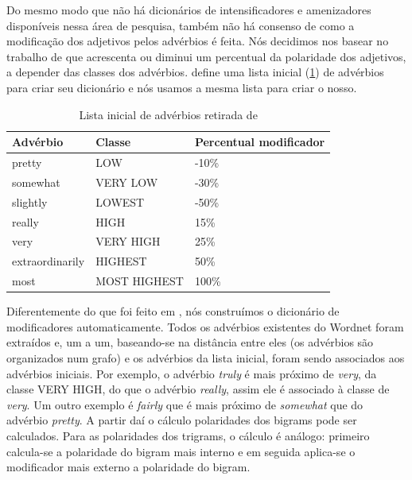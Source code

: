 Do mesmo modo que não há dicionários de intensificadores e amenizadores disponíveis nessa área de pesquisa, também não há consenso de como a modificação dos adjetivos pelos advérbios é feita. Nós decidimos nos basear no trabalho de \cite{taboada2011lexicon} que acrescenta ou diminui um percentual da polaridade dos adjetivos, a depender das classes dos advérbios.  define uma lista inicial (\ref{table:adv_seed}) de advérbios para criar seu dicionário e nós usamos a mesma lista para criar o nosso.

\begin{table}[!h]
	\centering
    \begin{tabular}{lll}
    Advérbio         				& Classe          & Percentual modificador \\ \hline
    pretty                   			& LOW 			   & -10\% \\
    somewhat                   	& VERY LOW  & -30\% \\
    slightly                   		& LOWEST 	   & -50\% \\
    really                   			& HIGH 			   & 15\% \\
    very                   			& VERY HIGH &  25\% \\
    extraordinarily             & HIGHEST 	   & 50\% \\
    most                   			& MOST HIGHEST & 100\% \\
    \end{tabular}
    \caption{Lista inicial de advérbios retirada de \cite{taboada2011lexicon}}
	\label{table:adv_seed}
\end{table}

Diferentemente do que foi feito em , nós construímos o dicionário de modificadores automaticamente. Todos os advérbios existentes do Wordnet foram extraídos e, um a um, baseando-se na distância entre eles (os advérbios são organizados num grafo) e os advérbios da lista inicial, foram sendo associados aos advérbios iniciais. Por exemplo, o advérbio \textit{truly} é mais próximo de \textit{very}, da classe VERY HIGH, do que o advérbio \textit{really}, assim ele é associado à classe de \textit{very}. Um outro exemplo é \textit{fairly} que é mais próximo de \textit{somewhat} que do advérbio \textit{pretty}. A partir daí o cálculo polaridades dos bigrams pode ser calculados. Para as polaridades dos trigrams, o cálculo é análogo: primeiro calcula-se a polaridade do bigram mais interno e em seguida aplica-se o modificador mais externo a polaridade do bigram.


